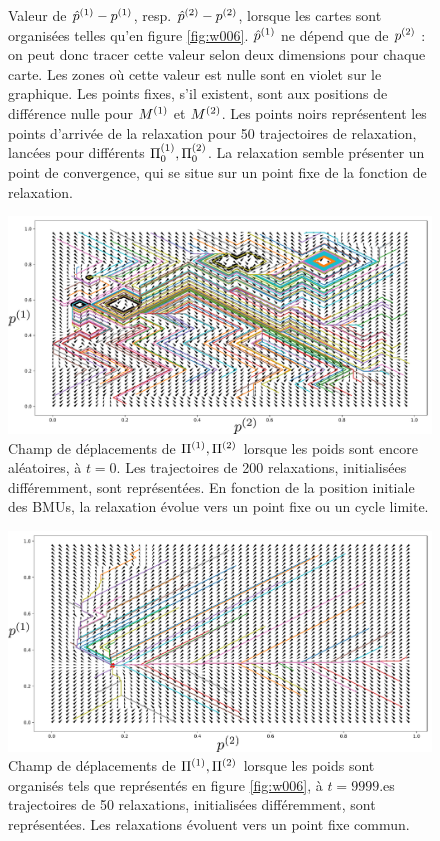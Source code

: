 \documentclass[../main]{subfiles}
\begin{document}
\begin{figure}
\begin{minipage}{0.5\textwidth}
\end{minipage}
\caption{Valeur de ${\hat{p}}^{({1})} - p^{({1})}$, resp. ${\hat{p}}^{({2})} - p^{({2})}$, lorsque les cartes sont organisées telles qu'en figure \ref{fig:w006}. ${\hat{p}}^{({1})}$ ne dépend que de $p^{({2})}$ : on peut donc tracer cette valeur selon deux dimensions pour chaque carte. Les zones où cette valeur est nulle sont en violet sur le graphique. Les points fixes, s'il existent, sont aux positions de différence nulle pour $M^{({1})}$ et $M^{({2})}$. Les points noirs représentent les points d'arrivée de la relaxation pour 50 trajectoires de relaxation, lancées pour différents $\Pi_0^{({1})}, \Pi_0^{({2})}$. La relaxation semble présenter un point de convergence, qui se situe sur un point fixe de la fonction de relaxation.}
\label{fig:diff_relax_notraj}
\end{figure}

\begin{figure}
\centering
\includegraphics[width=\textwidth]{champ_006_t1.pdf}
\caption{Champ de déplacements de $\Pi^{({1})},\Pi^{({2})}$ lorsque les poids sont encore aléatoires, à $t=0$. Les trajectoires de 200 relaxations, initialisées différemment, sont représentées. En fonction de la position initiale des BMUs, la relaxation évolue vers un point fixe ou un cycle limite. }
\label{fig:champ_0}
\end{figure}


\begin{figure}
\centering
\includegraphics[width=\textwidth]{champ_006.pdf}
\caption{Champ de déplacements de $\Pi^{({1})},\Pi^{({2})}$ lorsque les poids sont organisés tels que représentés en figure \ref{fig:w006}, à $t=9999$.es trajectoires de 50  relaxations, initialisées différemment, sont représentées. Les relaxations évoluent vers un point fixe commun.}
\label{fig:champ_9999}
\end{figure}
\end{document}
